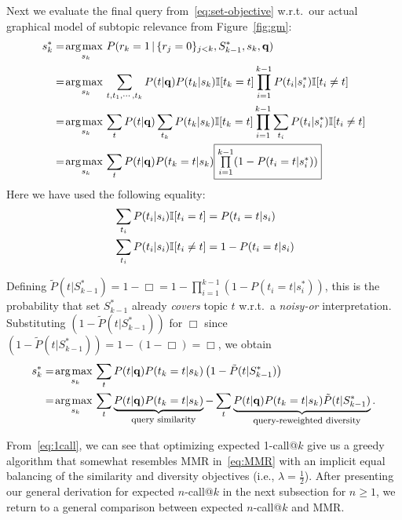 Next we evaluate the final query from~\eqref{eq:set-objective} w.r.t.\
our actual graphical model of subtopic relevance from Figure~\ref{fig:gm}:
\begin{align}
s_k^* & = \argmax_{s_{k}} P( r_k=1 \, | \, \{ r_{j}=0 \}_{j<k}, S_{k-1}^*,s_k,\vec{q}) \nonumber \\
& = \argmax_{s_{k}} \sum_{t, t_1, \cdots, t_{k}} P(t|\vec{q}) P(t_k|s_k) \I[t_k = t] \prod_{i=1}^{k-1} P(t_i|s_i^*) \I[t_i\neq t]\nonumber \\
& = \argmax_{s_{k}} \sum_{t} P(t|\vec{q}) \sum_{t_{k}} P(t_k|s_k) \I[t_k = t] \prod_{i=1}^{k-1} \sum_{t_{i}} P(t_i|s_i^*) \I[t_i \neq t]\nonumber \\
& = \argmax_{s_{k}} \sum_{t} P(t|\vec{q}) P(t_k=t|s_k) \fbox{$\prod\limits_{i=1}^{k-1} (1 - P(t_i=t|s_i^*))$} \label{eq:partial_simp}
\end{align}
Here we have used the following equality:
\begin{align*}
& \sum_{t_{i}} P(t_i|s_i) \mathbb{I}[t_i = t] =  P(t_i=t|s_i) \\
& \sum_{t_{i}} P(t_i|s_i) \mathbb{I}[t_i \neq t] = 1 - P(t_i=t|s_i)
\end{align*}

Defining $\tilde{P}(t | S_{k-1}^*) = 1 - \Box = 1 - \prod_{i=1}^{k-1} (1 -
  P(t_i=t|s_i^*))$, this is the probability that 
set $S_{k-1}^*$ already \emph{covers} topic $t$ 
w.r.t.\ a \emph{noisy-or} interpretation.  Substituting
$(1 - \tilde{P}(t | S_{k-1}^*))$ for $\Box$ since 
$(1 - \tilde{P}(t | S_{k-1}^*)) = 1 - (1 - \Box) = \Box$, we obtain
\begin{align}
s_k^* & = \argmax_{s_{k}} \sum_{t} P(t|\vec{q}) P(t_k=t|s_k) \left( 1 - \tilde{P}(t | S_{k-1}^*) \right) \nonumber \\
      & = \argmax_{s_{k}} \sum_{t} \underbrace{P(t|\vec{q}) P(t_k=t|s_k)}_{\mbox{\footnotesize query similarity}} - \sum_{t} \underbrace{P(t|\vec{q}) P(t_k=t|s_k) \tilde{P}(t | S_{k-1}^*)}_{\mbox{\footnotesize query-reweighted diversity}}. \label{eq:1call}
\end{align}

From~\eqref{eq:1call}, we can see that optimizing expected 1-call@$k$
give us a greedy algorithm that somewhat resembles MMR
in~\eqref{eq:MMR} with an implicit equal balancing of the similarity
and diversity objectives (i.e., $\lambda = \frac{1}{2}$).  After presenting our
general derivation for expected $n$-call@$k$ in the next subsection
for $n \geq 1$, we return to a general comparison between expected
$n$-call@$k$ and MMR.

